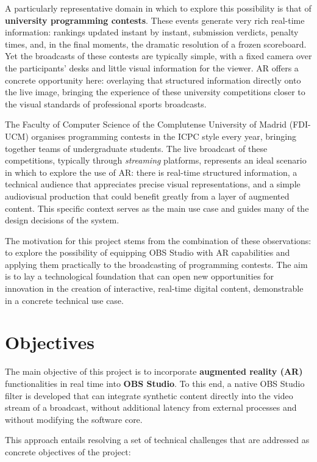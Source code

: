 A particularly representative domain in which to explore this possibility is that of \textbf{university programming contests}. These events generate very rich real-time information: rankings updated instant by instant, submission verdicts, penalty times, and, in the final moments, the dramatic resolution of a frozen scoreboard. Yet the broadcasts of these contests are typically simple, with a fixed camera over the participants' desks and little visual information for the viewer. AR offers a concrete opportunity here: overlaying that structured information directly onto the live image, bringing the experience of these university competitions closer to the visual standards of professional sports broadcasts.

The Faculty of Computer Science of the Complutense University of Madrid (FDI-UCM) organises programming contests in the ICPC style every year, bringing together teams of undergraduate students. The live broadcast of these competitions, typically through \textit{streaming} platforms, represents an ideal scenario in which to explore the use of AR: there is real-time structured information, a technical audience that appreciates precise visual representations, and a simple audiovisual production that could benefit greatly from a layer of augmented content. This specific context serves as the main use case and guides many of the design decisions of the system.

The motivation for this project stems from the combination of these observations: to explore the possibility of equipping OBS Studio with AR capabilities and applying them practically to the broadcasting of programming contests. The aim is to lay a technological foundation that can open new opportunities for innovation in the creation of interactive, real-time digital content, demonstrable in a concrete technical use case.


\section{Objectives}
\label{sec:objetivos_en}

The main objective of this project is to incorporate \textbf{augmented reality (AR)} functionalities in real time into \textbf{OBS Studio}. To this end, a native OBS Studio filter is developed that can integrate synthetic content directly into the video stream of a broadcast, without additional latency from external processes and without modifying the software core.

This approach entails resolving a set of technical challenges that are addressed as concrete objectives of the project:

